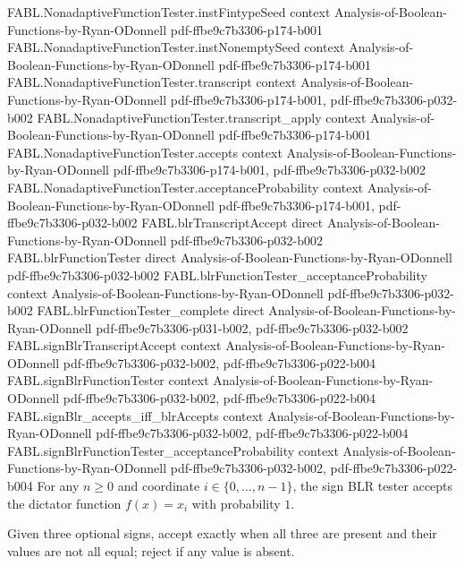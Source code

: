 \begin{theorem}
\proofstep
  {FABL.NonadaptiveFunctionTester.instFintypeSeed}
  {context}
  {Analysis-of-Boolean-Functions-by-Ryan-ODonnell}
  {pdf-ffbe9c7b3306-p174-b001}
\proofstep
  {FABL.NonadaptiveFunctionTester.instNonemptySeed}
  {context}
  {Analysis-of-Boolean-Functions-by-Ryan-ODonnell}
  {pdf-ffbe9c7b3306-p174-b001}
\proofstep
  {FABL.NonadaptiveFunctionTester.transcript}
  {context}
  {Analysis-of-Boolean-Functions-by-Ryan-ODonnell}
  {pdf-ffbe9c7b3306-p174-b001,
    pdf-ffbe9c7b3306-p032-b002}
\proofstep
  {FABL.NonadaptiveFunctionTester.transcript_apply}
  {context}
  {Analysis-of-Boolean-Functions-by-Ryan-ODonnell}
  {pdf-ffbe9c7b3306-p174-b001}
\proofstep
  {FABL.NonadaptiveFunctionTester.accepts}
  {context}
  {Analysis-of-Boolean-Functions-by-Ryan-ODonnell}
  {pdf-ffbe9c7b3306-p174-b001,
    pdf-ffbe9c7b3306-p032-b002}
\proofstep
  {FABL.NonadaptiveFunctionTester.acceptanceProbability}
  {context}
  {Analysis-of-Boolean-Functions-by-Ryan-ODonnell}
  {pdf-ffbe9c7b3306-p174-b001,
    pdf-ffbe9c7b3306-p032-b002}
\proofstep
  {FABL.blrTranscriptAccept}
  {direct}
  {Analysis-of-Boolean-Functions-by-Ryan-ODonnell}
  {pdf-ffbe9c7b3306-p032-b002}
\proofstep
  {FABL.blrFunctionTester}
  {direct}
  {Analysis-of-Boolean-Functions-by-Ryan-ODonnell}
  {pdf-ffbe9c7b3306-p032-b002}
\proofstep
  {FABL.blrFunctionTester_acceptanceProbability}
  {context}
  {Analysis-of-Boolean-Functions-by-Ryan-ODonnell}
  {pdf-ffbe9c7b3306-p032-b002}
\proofstep
  {FABL.blrFunctionTester_complete}
  {direct}
  {Analysis-of-Boolean-Functions-by-Ryan-ODonnell}
  {pdf-ffbe9c7b3306-p031-b002,
    pdf-ffbe9c7b3306-p032-b002}
\proofstep
  {FABL.signBlrTranscriptAccept}
  {context}
  {Analysis-of-Boolean-Functions-by-Ryan-ODonnell}
  {pdf-ffbe9c7b3306-p032-b002,
    pdf-ffbe9c7b3306-p022-b004}
\proofstep
  {FABL.signBlrFunctionTester}
  {context}
  {Analysis-of-Boolean-Functions-by-Ryan-ODonnell}
  {pdf-ffbe9c7b3306-p032-b002,
    pdf-ffbe9c7b3306-p022-b004}
\proofstep
  {FABL.signBlr_accepts_iff_blrAccepts}
  {context}
  {Analysis-of-Boolean-Functions-by-Ryan-ODonnell}
  {pdf-ffbe9c7b3306-p032-b002,
    pdf-ffbe9c7b3306-p022-b004}
\proofstep
  {FABL.signBlrFunctionTester_acceptanceProbability}
  {context}
  {Analysis-of-Boolean-Functions-by-Ryan-ODonnell}
  {pdf-ffbe9c7b3306-p032-b002,
    pdf-ffbe9c7b3306-p022-b004}
For any $n\ge 0$ and coordinate $i\in\{0,\ldots,n-1\}$, the sign BLR tester accepts the
dictator function $f(x)=x_i$ with probability $1$.
\end{theorem}

\begin{definition}
\label{FABL.naeTranscriptAccept}
\leanok
{}
Given three optional signs, accept exactly when all three are present and their values
are not all equal; reject if any value is absent.
\end{definition}

